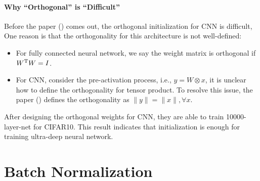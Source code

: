 \paragraph{Why ``Orthogonal'' is ``Difficult''}
Before the paper (\cite{pmlr-v80-xiao18a}) comes out, the orthogonal initialization for CNN is difficult, One reason is that the orthogonality for this architecture is not well-defined:
\begin{itemize}
\item
For fully connected neural network, we say the weight matrix is orthogonal if $W^{\mathrm T} W=I$.
\item
For CNN, consider the pre-activation process, i.e., $y=W\otimes x$, it is unclear how to define the orthogonality for tensor product.
To resolve this issue, the paper (\cite{pmlr-v80-xiao18a}) defines the orthogonality as $\|y\|=\|x\|,\forall x$.
\end{itemize}
After designing the orthogonal weights for CNN, they are able to train 10000-layer-net for CIFAR10.
This result indicates that initialization is enough for training ultra-deep neural network.

\section{Batch Normalization}
